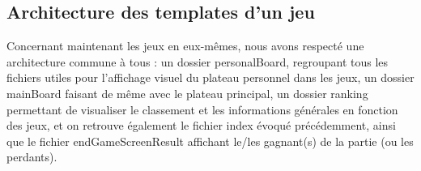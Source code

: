 \documentclass{article}
\begin{document}
        \subsection{Architecture des templates d'un jeu}
            Concernant maintenant les jeux en eux-mêmes, nous avons respecté une architecture commune à tous : un dossier personalBoard, regroupant tous les fichiers utiles pour l'affichage visuel du plateau personnel dans les jeux, un dossier mainBoard faisant de même avec le plateau principal, un dossier ranking permettant de visualiser le classement et les informations générales en fonction des jeux, et on retrouve également le fichier index évoqué précédemment, ainsi que le fichier endGameScreenResult affichant le/les gagnant(s) de la partie (ou les perdants).
\end{document}
